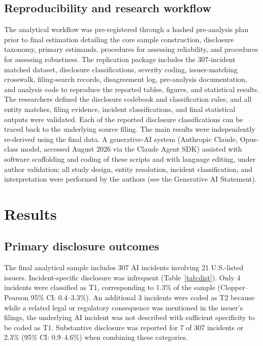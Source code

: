 \documentclass[utf8]{FrontiersinHarvard}
\begin{document}
\subsection{Reproducibility and research workflow}
The analytical workflow was pre-registered through a hashed pre-analysis plan prior to final estimation detailing the core sample construction, disclosure taxonomy, primary estimands, procedures for assessing reliability, and procedures for assessing robustness. The replication package includes the 307-incident matched dataset, disclosure classifications, severity coding, issuer-matching crosswalk, filing-search records, disagreement log, pre-analysis documentation, and analysis code to reproduce the reported tables, figures, and statistical results. The researchers defined the disclosure codebook and classification rules, and all entity matches, filing evidence, incident classifications, and final statistical outputs were validated. Each of the reported disclosure classifications can be traced back to the underlying source filing. The main results were independently re-derived using the final data. A generative-AI system (Anthropic Claude, Opus-class model, accessed August 2026 via the Claude Agent SDK) assisted with software scaffolding and coding of these scripts and with language editing, under author validation; all study design, entity resolution, incident classification, and interpretation were performed by the authors (see the Generative AI Statement).

\section{Results}

\subsection{Primary disclosure outcomes}
The final analytical sample includes 307 AI incidents involving 21 U.S.-listed issuers. Incident-specific disclosure was infrequent (Table~\ref{tab:dist}). Only 4 incidents were classified as T1, corresponding to 1.3\% of the sample (Clopper--Pearson 95\% CI: 0.4--3.3\%). An additional 3 incidents were coded as T2 because while a related legal or regulatory consequence was mentioned in the issuer's filings, the underlying AI incident was not described with sufficient specificity to be coded as T1. Substantive disclosure was reported for 7 of 307 incidents or 2.3\% (95\% CI: 0.9--4.6\%) when combining these categories.
\end{document}
